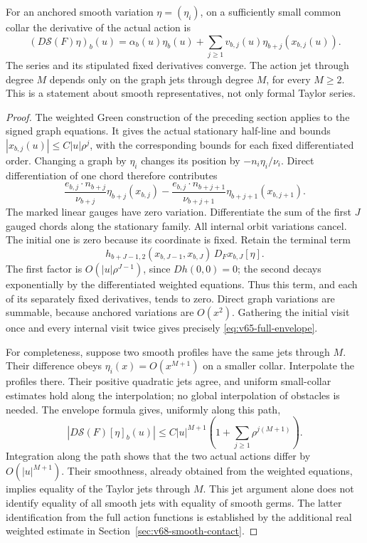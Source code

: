 \begin{lemma}\label{lem:v65-envelope}
For an anchored smooth variation $\eta=(\eta_i)$, on a sufficiently
small common collar the derivative of the actual action is
\begin{equation}\label{eq:v65-full-envelope}
 (D\mathcal S(F)\eta)_b(u)
   =\alpha_b(u)\eta_b(u)
        +\sum_{j\ge1}v_{b,j}(u)\eta_{b+j}(x_{b,j}(u)).
\end{equation}
The series and its stipulated fixed derivatives converge.  The action
jet through degree $M$ depends only on the graph jets through degree
$M$, for every $M\ge2$.  This is a statement about smooth representatives,
not only formal Taylor series.
\end{lemma}
\begin{proof}
The weighted Green construction of the preceding section applies to the
signed graph equations.  It gives the actual stationary half-line and
bounds $|x_{b,j}(u)|\le C|u|\rho^j$, with the corresponding bounds
for each fixed differentiated order.  Changing a graph by $\eta_i$
changes its position by $-n_i\eta_i/\nu_i$.  Direct differentiation
of one chord therefore contributes
\[
 \frac{e_{b,j}\cdot n_{b+j}}{\nu_{b+j}}
                  \eta_{b+j}(x_{b,j})
 -\frac{e_{b,j}\cdot n_{b+j+1}}{\nu_{b+j+1}}
                  \eta_{b+j+1}(x_{b,j+1}).
\]
The marked linear gauges have zero variation.  Differentiate the sum of
the first $J$ gauged chords along the stationary family.  All internal
orbit variations cancel.  The initial one is zero because its coordinate
is fixed.  Retain the terminal term
\[
 h_{b+J-1,2}(x_{b,J-1},x_{b,J})\,D_Fx_{b,J}[\eta].
\]
The first factor is $O(|u|\rho^{J-1})$, since $Dh(0,0)=0$;
the second decays exponentially by the differentiated weighted equations.
Thus this term, and each of its separately fixed derivatives, tends to
zero.  Direct graph variations are summable, because anchored variations
are $O(x^2)$.  Gathering the initial visit once and every internal visit
twice gives precisely \eqref{eq:v65-full-envelope}.

For completeness, suppose two smooth profiles have the same jets through
$M$.  Their difference obeys $\eta_i(x)=O(x^{M+1})$ on a smaller
collar.  Interpolate the profiles there.  Their positive quadratic jets
agree, and uniform small-collar estimates hold along the interpolation;
no global interpolation of obstacles is needed.  The envelope formula
gives, uniformly along this path,
\[
 |D\mathcal S(F)[\eta]_b(u)|
  \le C|u|^{M+1}\left(1+\sum_{j\ge1}\rho^{j(M+1)}\right).
\]
Integration along the path shows that the two actual actions differ by
$O(|u|^{M+1})$.  Their smoothness, already obtained from the weighted
equations, implies equality of the Taylor jets through $M$.
This jet argument alone does not identify equality of all smooth jets
with equality of smooth germs.  The latter identification from the full
action functions is established by the additional real weighted estimate
in Section~\ref{sec:v68-smooth-contact}.
\end{proof}

